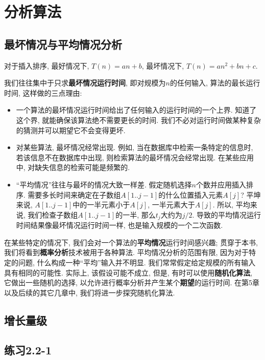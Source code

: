 \documentclass[UTF8,a4paper,zihao=-4,oneside,onecolumn,scheme=chinese,autoindent=true]{ctexbook}
\begin{document}
\section{分析算法}

\subsection*{最坏情况与平均情况分析}

对于插入排序, 最好情况下, $T(n)=an+b$, 最坏情况下, $T(n)=an^2+bn+c$.

我们往往集中于只求\textbf{最坏情况运行时间}, 即对规模为$n$的任何输入, 算法的最长运行时间, 这样做的三点理由:
\begin{itemize}
    \item 一个算法的最坏情况运行时间给出了任何输入的运行时间的一个上界. 知道了这个界, 就能确保该算法绝不需要更长的时间. 我们不必对运行时间做某种复杂的猜测并可以期望它不会变得更坏.
    \item 对某些算法, 最坏情况经常出现. 例如, 当在数据库中检索一条特定的信息时, 若该信息不在数据库中出现, 则检索算法的最坏情况会经常出现. 在某些应用中, 对缺失信息的检索可能是频繁的.
    \item “平均情况”往往与最坏的情况大致一样差. 假定随机选择$n$个数并应用插入排序. 需要多长时间来确定在子数组$A[1..j-1]$的什么位置插入元素$A[j]$? 平坤来说, $A[1..j-1]$中的一半元素小于$A[j]$, 一半元素大于$A[j]$. 所以, 平均来说, 我们检查子数组$A[1..j-1]$的一半, 那么$t_{j}$大约为$j/2$. 导致的平均情况运行时间结果像最坏情况运行时间一样, 也是输入规模的一个二次函数.
\end{itemize}

在某些特定的情况下, 我们会对一个算法的\textbf{平均情况}运行时间感兴趣; 贯穿于本书, 我们将看到\textbf{概率分析}技术被用于各种算法. 平均情况分析的范围有限, 因为对于特定的问题, 什么构成一种“平均”输入并不明显. 我们常常假定给定规模的所有输入具有相同的可能性. 实际上, 该假设可能不成立, 但是, 有时可以使用\textbf{随机化算法}, 它做出一些随机的选择, 以允许进行概率分析并产生某个\textbf{期望}的运行时间. 在第5章以及后续的其它几章中, 我们将进一步探究随机化算法.

\subsection*{增长量级}



\subsection*{练习2.2-1}
\end{document}

